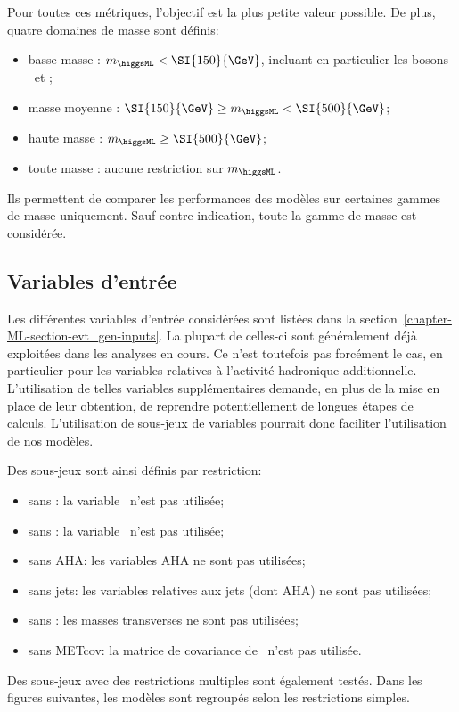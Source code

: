 Pour toutes ces métriques, l'objectif est la plus petite valeur possible.
De plus, quatre domaines de masse sont définis:
\begin{itemize}
\item basse masse : $m_{\higgsML} < \SI{150}{\GeV}$, incluant en particulier les bosons \Zboson\ et \higgs;
\item masse moyenne : $\SI{150}{\GeV} \geq m_{\higgsML} < \SI{500}{\GeV}$;
\item haute masse : $m_{\higgsML} \geq \SI{500}{\GeV}$;
\item toute masse : aucune restriction sur $m_{\higgsML}$.
\end{itemize}
Ils permettent de comparer les performances des modèles sur certaines gammes de masse uniquement.
Sauf contre-indication, toute la gamme de masse est considérée.
\subsection{Variables d'entrée}
Les différentes variables d'entrée considérées sont listées dans la section~\ref{chapter-ML-section-evt_gen-inputs}.
La plupart de celles-ci sont généralement déjà exploitées dans les analyses en cours.
Ce n'est toutefois pas forcément le cas, en particulier pour les variables relatives à l'activité hadronique additionnelle.
L'utilisation de telles variables supplémentaires demande,
en plus de la mise en place de leur obtention,
de reprendre potentiellement de longues étapes de calculs.
L'utilisation de sous-jeux de variables pourrait donc faciliter l'utilisation de nos modèles.
\par
Des sous-jeux sont ainsi définis par restriction:
\begin{itemize}
\item sans \Npu: la variable \Npu\ n'est pas utilisée;
\item sans \Nnu: la variable \Nnu\ n'est pas utilisée;
\item sans AHA: les variables AHA ne sont pas utilisées;
\item sans jets: les variables relatives aux jets (dont AHA) ne sont pas utilisées;
\item sans \mT: les masses transverses ne sont pas utilisées;
\item sans METcov: la matrice de covariance de \MET\ n'est pas utilisée.
\end{itemize}
Des sous-jeux avec des restrictions multiples sont également testés.
Dans les figures suivantes, les modèles sont regroupés selon les restrictions simples.
